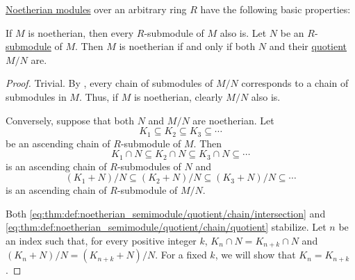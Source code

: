 \begin{proposition}\label{thm:def:noetherian_semimodule}
  \hyperref[def:noetherian_semimodule]{Noetherian modules} over an arbitrary ring \( R \) have the following basic properties:
  \begin{thmenum}
     If \( M \) is noetherian, then every \( R \)-submodule of \( M \) also is.
     Let \( N \) be an \( R \)-\hyperref[def:module/submodel]{submodule} of \( M \). Then \( M \) is noetherian if and only if both \( N \) and their \hyperref[def:module/quotient]{quotient} \( M / N \) are.
  \end{thmenum}
\end{proposition}
\begin{proof}
   Trivial.
   By , every chain of submodules of \( M / N \) corresponds to a chain of submodules in \( M \). Thus, if \( M \) is noetherian, clearly \( M / N \) also is.

  Conversely, suppose that both \( N \) and \( M / N \) are noetherian. Let
  \begin{equation}\label{eq:thm:def:noetherian_semimodule/quotient/chain}
    K_1 \subseteq K_2 \subseteq K_3 \subseteq \cdots
  \end{equation}
  be an ascending chain of \( R \)-submodule of \( M \). Then
  \begin{equation}\label{eq:thm:def:noetherian_semimodule/quotient/chain/intersection}
    K_1 \cap N \subseteq K_2 \cap N \subseteq K_3 \cap N \subseteq \cdots
  \end{equation}
  is an ascending chain of \( R \)-submodules of \( N \) and
  \begin{equation}\label{eq:thm:def:noetherian_semimodule/quotient/chain/quotient}
    (K_1 + N) / N \subseteq (K_2 + N) / N \subseteq (K_3 + N) / N \subseteq \cdots
  \end{equation}
  is an ascending chain of \( R \)-submodule of \( M / N \).

  Both \eqref{eq:thm:def:noetherian_semimodule/quotient/chain/intersection} and \eqref{eq:thm:def:noetherian_semimodule/quotient/chain/quotient} stabilize. Let \( n \) be an index such that, for every positive integer \( k \), \( K_n \cap N = K_{n + k} \cap N \) and \( (K_n + N) / N = (K_{n + k} + N) / N \). For a fixed \( k \), we will show that \( K_n = K_{n + k} \).


\end{proof}
